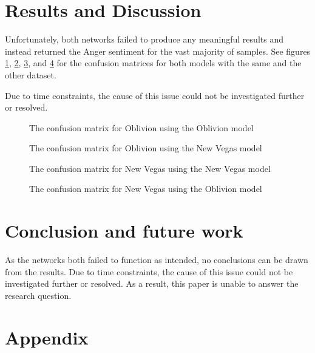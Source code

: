 \documentclass[journal]{IEEEtran}
\begin{document}
\section{Results and Discussion}
Unfortunately, both networks failed to produce any meaningful results and instead returned
the Anger sentiment for the vast majority of samples. See figures \ref{fig:confusion_ob_same},
\ref{fig:confusion_ob}, \ref{fig:confusion_nv_same}, and \ref{fig:confusion_nv} for
the confusion matrices for both models with the same and the other dataset.

Due to time constraints, the cause of this issue could not be investigated further
or resolved.

\begin{figure}
    
    \caption{The confusion matrix for Oblivion using the Oblivion model}
    \label{fig:confusion_ob_same}
\end{figure}

\begin{figure}
    
    \caption{The confusion matrix for Oblivion using the New Vegas model}
    \label{fig:confusion_ob}
\end{figure}

\begin{figure}
    
    \caption{The confusion matrix for New Vegas using the New Vegas model}
    \label{fig:confusion_nv_same}
\end{figure}

\begin{figure}
    
    \caption{The confusion matrix for New Vegas using the Oblivion model}
    \label{fig:confusion_nv}
\end{figure}

\section{Conclusion and future work}
As the networks both failed to function as intended, no conclusions can be drawn from the results.
Due to time constraints, the cause of this issue could not be investigated further or resolved.
As a result, this paper is unable to answer the research question.


\section*{Appendix}
\end{document}
